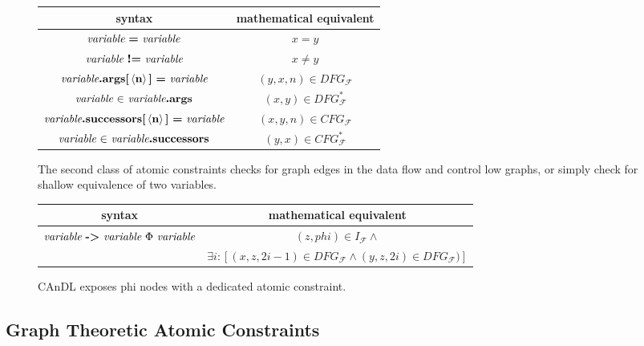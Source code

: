 \begin{figure}[h]
  \centering
  \begin{tabular}{|c|c|}
    \hline
    syntax & mathematical equivalent \\
    \hline
    \hline
    $\text{\it variable}\ \text{\bf =}\ \text{\it variable}$ & $x=y$\\
    $\text{\it variable}\ \text{\bf !=}\ \text{\it variable}$ & $x\neq y$\\
    \hline
    $\text{\it variable}\text{\bf.args[}\left<\text{\bf n}\right>\text{\bf]}\ \text{\bf =}\ \text{\it variable}$ & $(y,x,n)\in DFG_\mathcal F$\\
    $\text{\it variable}\ \text{\bf $\in$}\ \text{\it variable}\text{\bf .args}$ & $(x,y)\in DFG_\mathcal F^*$\\
    \hline
    $\text{\it variable}\text{\bf.successors[}\left<\text{\bf n}\right>\text{\bf]}\ \text{\bf =}\ \text{\it variable}$ & $(x,y,n)\in CFG_\mathcal F$\\
    $\text{\it variable}\ \text{\bf $\in$}\ \text{\it variable}\text{\bf .successors}$ & $(y,x)\in CFG_\mathcal F^*$\\
    \hline
  \end{tabular}
  \caption{The second class of atomic constraints checks for graph edges in the
           data flow and control low graphs, or simply check for shallow
           equivalence of two variables.}
  \label{twovaratomics}
\end{figure}

\begin{figure}[h]
  \centering
  \begin{tabular}{|c|c|}
    \hline
    syntax & mathematical equivalent \\
    \hline
    \hline
    \multirow{2}{*}{$\text{\it variable}\ \text{\bf ->}\ \text{\it variable}\ \Phi\ \text{\it variable}$} & $(z,phi)\in I_\mathcal F\land$ \\
                                                                                                       & $\exists i\colon [(x,z,2i-1)\in DFG_\mathcal F\land (y,z,2i)\in DFG_\mathcal F)]$\\
    \hline
  \end{tabular}
  \caption{CAnDL exposes phi nodes with a dedicated atomic constraint.}
  \label{phiatomic}
\end{figure}

\subsection{Graph Theoretic Atomic Constraints}

